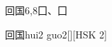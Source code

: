 \begin{entry}{回国}{6,8}{⼞、⼞}
  \begin{phonetics}{回国}{hui2 guo2}[][HSK 2]
  \end{phonetics}
\end{entry}

